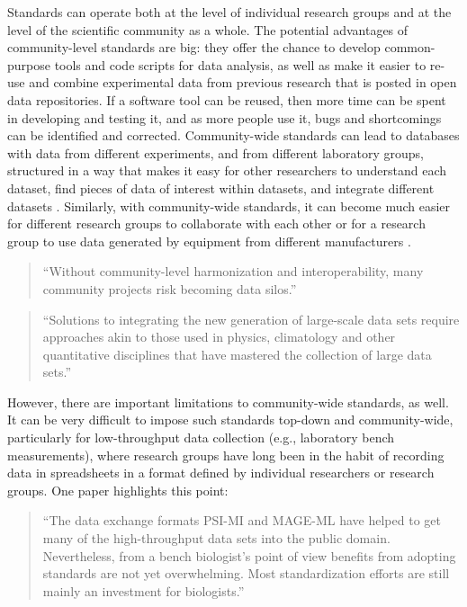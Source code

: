 \documentclass[]{tufte-book}
\begin{document}
Standards can operate both at the level of individual research groups and at the
level of the scientific community as a whole. The potential advantages of
community-level standards are big: they offer the chance to develop
common-purpose tools and code scripts for data analysis, as well as make it
easier to re-use and combine experimental data from previous research that is
posted in open data repositories. If a software tool can be reused, then more
time can be spent in developing and testing it, and as more people use it, bugs
and shortcomings can be identified and corrected. Community-wide standards can
lead to databases with data from different experiments, and from different
laboratory groups, structured in a way that makes it easy for other researchers
to understand each dataset, find pieces of data of interest within datasets, and
integrate different datasets \citep{lynch2008big}. Similarly, with community-wide
standards, it can become much easier for different research groups to
collaborate with each other or for a research group to use data generated by
equipment from different manufacturers \citep{schadt2010computational}.

\begin{quote}
``Without community-level harmonization and interoperability, many community
projects risk becoming data silos.'' \citep{sansone2012toward}
\end{quote}

\begin{quote}
``Solutions to integrating the new generation of large-scale data sets require
approaches akin to those used in physics, climatology and other quantitative
disciplines that have mastered the collection of large data sets.''
\citep{schadt2010computational}
\end{quote}

However, there are important limitations to community-wide standards, as well.
It can be very difficult to impose such standards top-down and community-wide,
particularly for low-throughput data collection (e.g., laboratory bench
measurements), where research groups have long been in the habit of recording
data in spreadsheets in a format defined by individual researchers or research
groups. One paper highlights this point:

\begin{quote}
``The data exchange formats PSI-MI and MAGE-ML have helped to get many of the
high-throughput data sets into the public domain. Nevertheless, from a bench
biologist's point of view benefits from adopting standards are not yet
overwhelming. Most standardization efforts are still mainly an investment for
biologists.'' \citep{brazma2006standards}
\end{quote}
\end{document}
